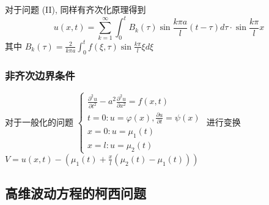 \documentclass[10pt]{yerbaformat}
\begin{document}
\par 对于问题 (II), 同样有齐次化原理得到
$$
    u(x, t)=\sum_{k=1}^{\infty} \int_{0}^{t} B_{k}(\tau) \sin \frac{k \pi a}{l}(t-\tau) d \tau \cdot \sin \frac{k \pi}{l} x
$$
其中 $B_{k}(\tau)=\frac{2}{k \pi a} \int_{0}^{t} f(\xi, \tau) \sin \frac{k \pi}{l} \xi d \xi$

\subsubsection{非齐次边界条件}
\par 对于一般化的问题 $\left\{\begin{array}{l}\frac{\partial^{2} u}{\partial t^{2}}-a^{2} \frac{\partial^{2} u}{\partial x^{2}}=f(x, t) \\ t=0: u=\varphi(x), \frac{\partial u}{\partial t}=\psi(x) \\ x=0: u=\mu_{1}(t) \\ x=l: u=\mu_{2}(t)\end{array}\right.$ 进行变换 $V=u(x,t)-(\mu_{1}(t)+\frac{x}{l}\left(\mu_{2}(t)-\mu_{1}(t)\right))$

\subsection{高维波动方程的柯西问题}



\end{document}
